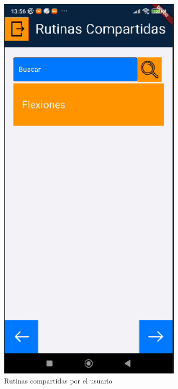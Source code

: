 \begin{figure}[H]
   \centering
    \includegraphics[width=0.8\textwidth]{pantallas/rutinasCompUsuario.png}
    \caption{Rutinas compartidas por el usuario}
    \label{fig:rutinasCompUsuario}
\end{figure}

